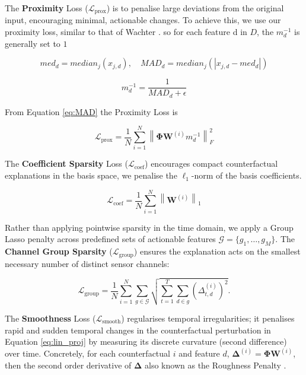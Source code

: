 \documentclass[runningheads]{llncs}
\begin{document}
	The \textbf{Proximity} Loss ($\mathcal{L}_{\text{prox}}$) is to penalise large deviations from the original input, encouraging minimal, actionable changes. To achieve this, we use our proximity loss, similar to that of Wachter \cite{wachter2017counterfactual}. so for each feature d in $D$, the $m_{d}^{-1}$ is generally set to $1$ 
	
	\begin{equation}
		med_d = median_j(x_{j, d}),
		\quad MAD_d = median_j(|x_{j,d} -med_d|)
	\end{equation}
	
	\begin{equation}
		\label{eq:MAD}
		m_{d}^{-1} = \frac{1}{MAD_d + \epsilon} 
	\end{equation}
	
	From Equation \ref{eq:MAD} the Proximity Loss is
	
	\begin{equation}
		\label{eq:L_prox}
		\mathcal{L}_{\text{prox}} = \frac{1}{N} \sum_{i = 1}^{N} \left\| \mathbf{\Phi}\mathbf{W}^{(i)} m_{d}^{-1} \right\|_F^{2}
	\end{equation}
	
	The \textbf{Coefficient Sparsity} Loss ($\mathcal{L}_{\text{coef}}$) encourages compact counterfactual explanations in
	the basis space, we penalise the $\ell_1$-norm of the basis coefficients. 
	
	\begin{equation}
		\label{eq:cf_L_sparse}
		\mathcal{L}_{\text{coef}} = \frac{1}{N} \sum_{i = 1}^{N} \left\| \mathbf{W}^{(i)} \right\|_1
	\end{equation}
	
	Rather than applying pointwise sparsity in the time domain, we apply a Group Lasso penalty across predefined sets of actionable features $\mathcal{G}=\{g_1,\dots,g_M\}$. The \textbf{Channel Group Sparsity} ($\mathcal{L}_{\mathrm{group}}$) ensures the explanation acts on the smallest necessary number of distinct sensor channels:
	
	\begin{equation}
		\label{eq:group_sparsity}
		\mathcal{L}_{\mathrm{group}} = \frac{1}{N} \sum_{i=1}^{N} \sum_{g \in \mathcal{G}} \sqrt{ \sum_{t=1}^{T} \sum_{d \in g} (\Delta_{t,d}^{(i)})^2 }.
	\end{equation}
	
	The \textbf{Smoothness} Loss ($\mathcal{L}_{\text{smooth}}$) regularises temporal irregularities; it penalises rapid and sudden temporal changes in the counterfactual perturbation in Equation \ref{eq:lin_proj} by measuring its discrete curvature (second difference) over time. Concretely, for each counterfactual $i$ and feature $d$, $\mathbf{\Delta}^{(i)} = \mathbf{\Phi}\mathbf{W}^{(i)}$, then the second order derivative of $\mathbf{\Delta}$ also known as the Roughness Penalty \cite{green1993nonparametric}. 
	
\end{document}
